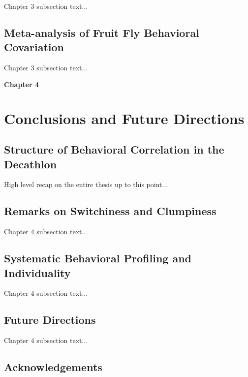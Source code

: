 \documentclass[12pt,letterpaper]{article}
\begin{document}
Chapter 3 subsection text...


\subsection{Meta-analysis of Fruit Fly Behavioral Covariation}

Chapter 3 subsection text...


\clearpage
\begin{center}
    \Large\textbf{Chapter 4}
    \thispagestyle{empty}       %
    \clearpage
\end{center}

\section{Conclusions and Future Directions}


\subsection{Structure of Behavioral Correlation in the Decathlon}

High level recap on the entire thesis up to this point...


\subsection{Remarks on Switchiness and Clumpiness}

Chapter 4 subsection text...


\subsection{Systematic Behavioral Profiling and Individuality}

Chapter 4 subsection text...


\subsection{Future Directions}

Chapter 4 subsection text...


\subsection{Acknowledgements}
\end{document}
